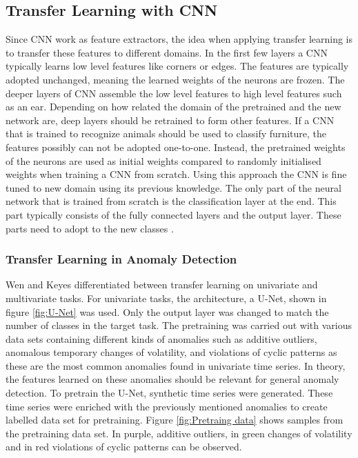 \subsection{Transfer Learning with CNN}
Since CNN work as feature extractors, the idea when applying transfer learning is to transfer these features to different domains. In the first few layers a CNN typically learns low level features like corners or edges. The features are typically adopted unchanged, meaning the learned weights of the neurons are frozen. The deeper layers of CNN assemble the low level features to high level features such as an ear. Depending on how related the domain of the pretrained and the new network are, deep layers should be retrained to form other features. If a CNN that is trained to recognize animals should be used to classify furniture, the features possibly can not be adopted one-to-one. Instead, the pretrained weights of the neurons are used as initial weights compared to randomly initialised weights when training a CNN from scratch. Using this approach the CNN is fine tuned to new domain using its previous knowledge. The only part of the neural network that is trained from scratch is the classification layer at the end. This part typically consists of the fully connected layers and the output layer. These parts need to adopt to the new classes \parencite{Chollet2018}. 

\subsubsection{Transfer Learning in Anomaly Detection} \label{TransferLearning}
Wen and Keyes \parencite*{Wen2019} differentiated between transfer learning on univariate and multivariate tasks. For univariate tasks, the architecture, a U-Net, shown in figure \ref{fig:U-Net} was used. Only the output layer was changed to match the number of classes in the target task. The pretraining was carried out with various data sets containing different kinds of anomalies such as additive outliers, anomalous temporary changes of volatility,
and violations of cyclic patterns as these are the most common anomalies found in univariate time series. In theory, the features learned on these anomalies should be relevant for general anomaly detection. To pretrain the U-Net, synthetic time series were generated. These time series were enriched with the previously mentioned anomalies to create labelled data set for pretraining. Figure \ref{fig:Pretraing data} shows samples from the pretraining data set. In purple, additive outliers, in green changes of volatility and in red violations of cyclic patterns can be observed.

